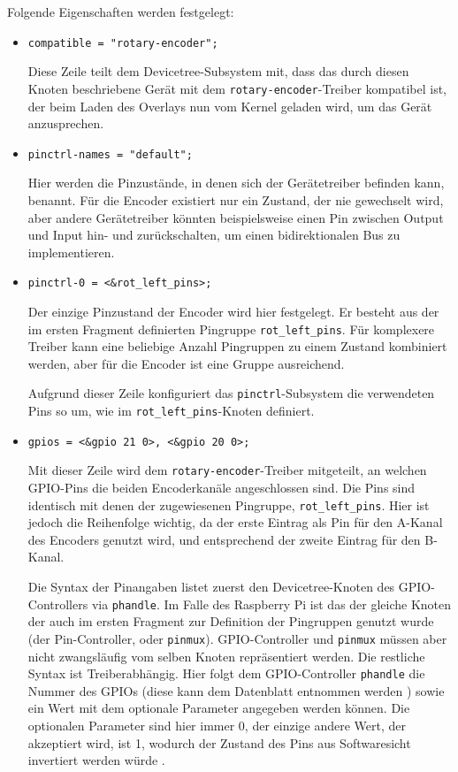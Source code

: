 \documentclass[german]{thesis_KBS}
\newcommand{\code}[1]{\texttt{#1}}  %
\begin{document}
Folgende Eigenschaften werden festgelegt:

\begin{itemize}
    \item \code{compatible = "rotary-encoder";}

    Diese Zeile teilt dem Devicetree-Subsystem mit, dass das durch diesen Knoten
    beschriebene Gerät mit dem \code{rotary-encoder}-Treiber kompatibel ist, der
    beim Laden des Overlays nun vom Kernel geladen wird, um das Gerät
    anzusprechen.

    \item \code{pinctrl-names = "default";}

    Hier werden die Pinzustände, in denen sich der Gerätetreiber befinden kann,
    benannt. Für die Encoder existiert nur ein Zustand, der nie gewechselt wird,
    aber andere Gerätetreiber könnten beispielsweise einen Pin zwischen Output
    und Input hin- und zurückschalten, um einen bidirektionalen Bus zu
    implementieren.

    \item \code{pinctrl-0 = <\&rot\_left\_pins>;}

    Der einzige Pinzustand der Encoder wird hier festgelegt. Er besteht aus der
    im ersten Fragment definierten Pingruppe \code{rot\_left\_pins}. Für
    komplexere Treiber kann eine beliebige Anzahl Pingruppen zu einem Zustand
    kombiniert werden, aber für die Encoder ist eine Gruppe ausreichend.

    Aufgrund dieser Zeile konfiguriert das \code{pinctrl}-Subsystem die
    verwendeten Pins so um, wie im \code{rot\_left\_pins}-Knoten definiert.

    \item \code{gpios = <\&gpio 21 0>, <\&gpio 20 0>;}

    Mit dieser Zeile wird dem \code{rotary-encoder}-Treiber mitgeteilt, an
    welchen GPIO-Pins die beiden Encoderkanäle angeschlossen sind. Die Pins sind
    identisch mit denen der zugewiesenen Pingruppe, \code{rot\_left\_pins}. Hier
    ist jedoch die Reihenfolge wichtig, da der erste Eintrag als Pin für den
    A-Kanal des Encoders genutzt wird, und entsprechend der zweite Eintrag für
    den B-Kanal.

    Die Syntax der Pinangaben listet zuerst den Devicetree-Knoten des
    GPIO-Controllers via \code{phandle}. Im Falle des Raspberry Pi ist das der
    gleiche Knoten der auch im ersten Fragment zur Definition der Pingruppen
    genutzt wurde (der Pin-Controller, oder \code{pinmux}). GPIO-Controller und
    \code{pinmux} müssen aber nicht zwangsläufig vom selben Knoten repräsentiert
    werden. Die restliche Syntax ist Treiberabhängig. Hier folgt dem
    GPIO-Controller \code{phandle} die Nummer des GPIOs (diese kann dem
    Datenblatt entnommen werden \cite{bcm2835-peripherals}) sowie ein Wert mit
    dem optionale Parameter angegeben werden können. Die optionalen Parameter
    sind hier immer 0, der einzige andere Wert, der akzeptiert wird, ist 1,
    wodurch der Zustand des Pins aus Softwaresicht invertiert werden würde
    \cite{devicetree-bcmgpio}.


\end{itemize}
\end{document}
